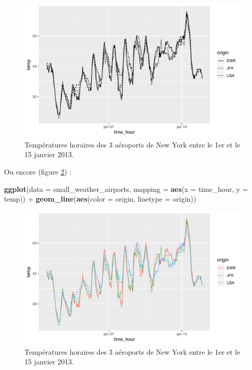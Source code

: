 \documentclass[
  a4paper,
]{article}
\newenvironment{Shaded}{\begin{snugshade}}{\end{snugshade}}
\newcommand{\DataTypeTok}[1]{\textcolor[rgb]{0.00,0.34,0.68}{#1}}
\newcommand{\KeywordTok}[1]{\textcolor[rgb]{0.12,0.11,0.11}{\textbf{#1}}}
\newcommand{\NormalTok}[1]{\textcolor[rgb]{0.12,0.11,0.11}{#1}}
\newcommand{\OperatorTok}[1]{\textcolor[rgb]{0.12,0.11,0.11}{#1}}
\newcommand{\StringTok}[1]{\textcolor[rgb]{0.75,0.01,0.01}{#1}}
\begin{document}
\begin{figure}[htpb]

{\centering \includegraphics[width=0.9\linewidth]{figure/linetype-1} 

}

\caption{Températures horaires des 3 aéroports de New York entre le 1er et le 15 janvier 2013.}\label{fig:linetype}
\end{figure}

Ou encore (figure \ref{fig:linetypecolor}) :

\begin{Shaded}
\begin{Highlighting}[]
\KeywordTok{ggplot}\NormalTok{(}\DataTypeTok{data =}\NormalTok{ small_weather_airports, }
       \DataTypeTok{mapping =} \KeywordTok{aes}\NormalTok{(}\DataTypeTok{x =}\NormalTok{ time_hour, }\DataTypeTok{y =}\NormalTok{ temp)) }\OperatorTok{+}
\StringTok{  }\KeywordTok{geom_line}\NormalTok{(}\KeywordTok{aes}\NormalTok{(}\DataTypeTok{color =}\NormalTok{ origin, }\DataTypeTok{linetype =}\NormalTok{ origin))}
\end{Highlighting}
\end{Shaded}

\begin{figure}[htpb]

{\centering \includegraphics[width=0.9\linewidth]{figure/linetypecolor-1} 

}

\caption{Températures horaires des 3 aéroports de New York entre le 1er et le 15 janvier 2013.}\label{fig:linetypecolor}
\end{figure}
\end{document}
